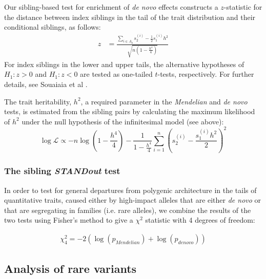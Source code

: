 \documentclass[12pt]{zHenriquesLab-StyleBioRxiv}
\begin{document}
Our sibling-based test for enrichment of {\em de novo} effects constructs a $z$-statistic 
for the distance between index siblings in the tail of the trait
distribution and their conditional siblings, as follows:
\begin{align*}
  z&=\frac{\sum_{i\in A_q}s_2^{(i)}-\frac{1}{2}s_1^{(i)}h^2} {\sqrt{n(1-\frac{h^4}{4})}}
\end{align*}
For index siblings in the lower and upper tails, the alternative
hypotheses of $H_1: z>0$ and $H_1: z<0$ are tested as one-tailed $t$-tests, respectively. For further details, 
see Souaiaia et al \cite{Souaiaia2024}.

The trait heritability, $h^2$, a required parameter in the {\em Mendelian} and {\em de novo} tests, 
is estimated from the sibling pairs by calculating the maximum likelihood of $h^2$ 
under the null hypothesis of the infinitesimal model (see above): 
\begin{equation*} \log \mathcal{L} \propto -n\log\left(1 -
    \frac{h^4}{4}\right) - \frac{1}{1-\frac{h^4}{4}} \sum_{i=1}^n
  \left( s_{2}^{(i)} - \frac{s_1^{(i)} h^2}{2}
  \right)^2
\end{equation*}

\subsubsection*{The sibling \textit{STANDout}  test} 

In order to test for general departures from polygenic architecture in the tails of 
quantitative traits, caused either by high-impact alleles that are either \emph{de novo} or 
that are segregating in families (i.e. rare alleles), we combine the results of the two tests 
using Fisher's method to give a $\chi^2$ statistic with 4 degrees of freedom: 

\begin{align*}
    \chi^2_4 = -2(\log(p_{Mendelian}) + \log(p_{de novo}))
\end{align*}




\clearpage \newpage

\subsection*{Analysis of rare variants} \label{sec:methods:rvs} 
\end{document}
